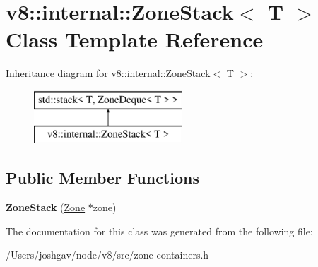 \hypertarget{classv8_1_1internal_1_1_zone_stack}{}\section{v8\+:\+:internal\+:\+:Zone\+Stack$<$ T $>$ Class Template Reference}
\label{classv8_1_1internal_1_1_zone_stack}
Inheritance diagram for v8\+:\+:internal\+:\+:Zone\+Stack$<$ T $>$\+:\begin{figure}[H]
\begin{center}
\leavevmode
\includegraphics[height=2.000000cm]{classv8_1_1internal_1_1_zone_stack}
\end{center}
\end{figure}
\subsection*{Public Member Functions}
\begin{DoxyCompactItemize}
\item 
{\bfseries Zone\+Stack} (\hyperlink{classv8_1_1internal_1_1_zone}{Zone} $\ast$zone)\hypertarget{classv8_1_1internal_1_1_zone_stack_a45ee8f83517d8580883b668601ddad82}{}\label{classv8_1_1internal_1_1_zone_stack_a45ee8f83517d8580883b668601ddad82}

\end{DoxyCompactItemize}


The documentation for this class was generated from the following file\+:\begin{DoxyCompactItemize}
\item 
/\+Users/joshgav/node/v8/src/zone-\/containers.\+h\end{DoxyCompactItemize}
